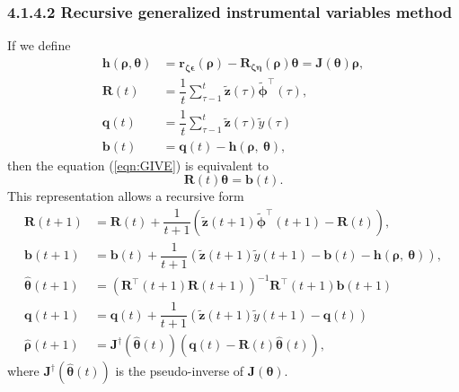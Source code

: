 \documentclass[11pt]{article}
\begin{document}
\begin{itemize}
\begin{itemize}
    \subsubsection*{4.1.4.2 Recursive generalized instrumental variables method}
    If we define
    \begin{equation} \tag{4.34} \begin{aligned} \mathbf{h} \left( \bm{\rho}, \bm{\theta} \right)  &=  \mathbf{r}_{ \bm{\zeta} \bm{\epsilon}} \left( \bm{\rho} \right) - \mathbf{R}_{\bm{\zeta} \bm{\eta}} \left( \bm{\rho} \right) \bm{\theta}  =  \mathbf{J} \left( \bm{\theta} \right) \bm{\rho}, \\
    \mathbf{R} \left( t \right)  &=  \dfrac{1}{t} \sum_{\tau-1}^{t} \widetilde{\mathbf{z}} \left( \tau \right) \widetilde{\bm{\phi}}^\top \left( \tau \right) , \\     
    \mathbf{q} \left( t \right)  &=  \dfrac{1}{t} \sum_{\tau-1}^{t} \widetilde{\mathbf{z}} \left( \tau \right) \widetilde{y} \left( \tau \right) \\     
    \mathbf{b} \left( t \right)  &=  \mathbf{q} \left( t \right) - \mathbf{h} \left( \bm{\rho}, \ \bm{\theta} \right)
    , \end{aligned} \end{equation}
    then the equation (\ref{eqn:GIVE}) is equivalent to
    \begin{equation} \tag{4.35} \mathbf{R} \left( t \right) \bm{\theta} = \mathbf{b} \left( t \right) . \end{equation}
    This representation allows a recursive form
    \begin{equation} \tag{4.36} \begin{aligned} 
    \mathbf{R} \left( t+1 \right)  &= \mathbf{R} \left( t \right) + \dfrac{1}{t+1} \left( \widetilde{\mathbf{z}} \left( t+1 \right) \widetilde{\bm{\phi}}^\top \left( t+1 \right) - \mathbf{R} \left( t \right) \right), \\
    \mathbf{b} \left( t+1 \right)  &= \mathbf{b} \left( t \right) + \dfrac{1}{t+1} \left( \widetilde{\mathbf{z}} \left( t+1 \right) \widetilde{y} \left( t+1 \right) - \mathbf{b} \left( t \right) - \mathbf{h} \left( \bm{\rho}, \ \bm{\theta} \right) \right), \\
    \widehat{\bm{\theta}} \left( t+1 \right)  &=  \left( \mathbf{R}^\top \left( t+1 \right) \mathbf{R} \left( t+1 \right) \right)^{-1} \mathbf{R}^\top \left( t+1 \right) \mathbf{b} \left( t+1 \right) \\
    \mathbf{q} \left( t+1 \right)  &= \mathbf{q} \left( t \right) + \dfrac{1}{t+1} \left( \widetilde{\mathbf{z}} \left( t+1 \right) \widetilde{y} \left( t+1 \right) - \mathbf{q} \left( t \right) \right) \\
    \widehat{\bm{\rho}} \left( t+1 \right)  &=  \mathbf{J}^\dagger \left( \widehat{\bm{\theta}} \left( t \right) \right) \left( \mathbf{q} \left( t \right) - \mathbf{R} \left( t \right) \widehat{\bm{\theta}} \left( t \right) \right) , \end{aligned} \end{equation}
    where $\mathbf{J}^\dagger \left( \widehat{\bm{\theta}} \left( t \right) \right)$ is the pseudo-inverse of $\mathbf{J} \left( \bm{\theta} \right)$.


\end{itemize}
\end{itemize}
\end{document}
